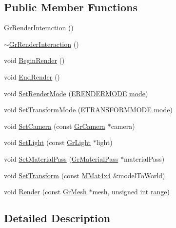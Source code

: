 \begin{CompactItemize}
\subsection*{Public Member Functions}
\begin{CompactItemize}
\item 
\hyperlink{class_gr_render_interaction_d73d649007ba8056e0531f41b6496aba}{GrRenderInteraction} ()
\item 
\hyperlink{class_gr_render_interaction_570089439862a3a1d444108a4263069b}{$\sim$GrRenderInteraction} ()
\item 
void \hyperlink{class_gr_render_interaction_4acbd37e6393d7c7b7ed2e01258a4c25}{BeginRender} ()
\item 
void \hyperlink{class_gr_render_interaction_642460b8e369c750b07f01311e420881}{EndRender} ()
\item 
void \hyperlink{class_gr_render_interaction_ee21a51db085ea59af7a2cdd0b5fdd58}{SetRenderMode} (\hyperlink{class_gr_render_interaction_c3028f317e185680efe057ea4df4cfd1}{ERENDERMODE} \hyperlink{glext__bak_8h_1e71d9c196e4683cc06c4b54d53f7ef5}{mode})
\item 
void \hyperlink{class_gr_render_interaction_29c894cb71437e178f517197209b6323}{SetTransformMode} (\hyperlink{class_gr_render_interaction_4d421ff0cd482c24f75c5337174b5938}{ETRANSFORMMODE} \hyperlink{glext__bak_8h_1e71d9c196e4683cc06c4b54d53f7ef5}{mode})
\item 
void \hyperlink{class_gr_render_interaction_8ffc348f96b4ab387fcd52dc1a229880}{SetCamera} (const \hyperlink{class_gr_camera}{GrCamera} $\ast$camera)
\item 
void \hyperlink{class_gr_render_interaction_83f3aad936c6f009ddefd6178a9861c4}{SetLight} (const \hyperlink{class_gr_light}{GrLight} $\ast$light)
\item 
void \hyperlink{class_gr_render_interaction_0d365eacc1fa2057eba4c4589842a377}{SetMaterialPass} (\hyperlink{class_gr_material_pass}{GrMaterialPass} $\ast$materialPass)
\item 
void \hyperlink{class_gr_render_interaction_17cb9298a3a360436a57eeb2b3759f69}{SetTransform} (const \hyperlink{class_m_mat4x4}{MMat4x4} \&modelToWorld)
\item 
void \hyperlink{class_gr_render_interaction_3542d05d0d9bd8f3ef237d46c518c2d4}{Render} (const \hyperlink{class_gr_mesh}{GrMesh} $\ast$mesh, unsigned int \hyperlink{glext__bak_8h_7b8ad0b27a927682837f95528fa454f5}{range})
\end{CompactItemize}


\subsection{Detailed Description}



\end{CompactItemize}
